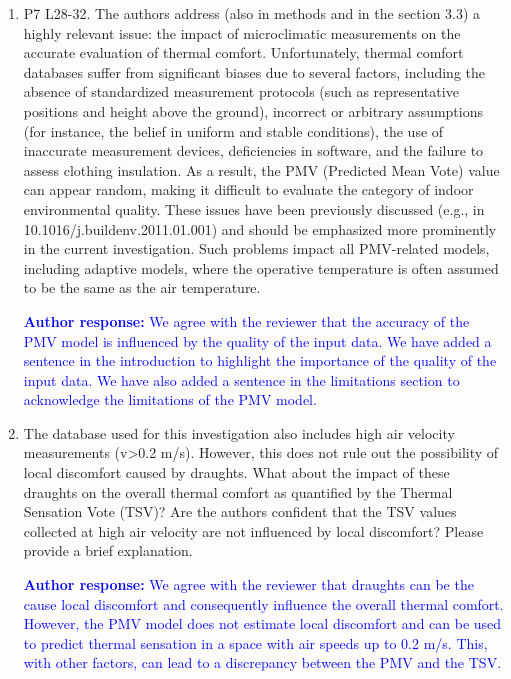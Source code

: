 \documentclass[a4paper, 10pt]{letter}
\newcommand{\response}[1]{\textcolor{blue}{\textbf{Author response:} #1}}
\begin{document}
\begin{letter}
\begin{enumerate}
            \item P7 L28-32.
            The authors address (also in methods and in the section 3.3) a highly relevant issue: the impact of microclimatic measurements on the accurate evaluation of thermal comfort.
            Unfortunately, thermal comfort databases suffer from significant biases due to several factors, including the absence of standardized measurement protocols (such as representative positions and height above the ground), incorrect or arbitrary assumptions (for instance, the belief in uniform and stable conditions), the use of inaccurate measurement devices, deficiencies in software, and the failure to assess clothing insulation.
            As a result, the PMV (Predicted Mean Vote) value can appear random, making it difficult to evaluate the category of indoor environmental quality.
            These issues have been previously discussed (e.g., in 10.1016/j.buildenv.2011.01.001) and should be emphasized more prominently in the current investigation.
            Such problems impact all PMV-related models, including adaptive models, where the operative temperature is often assumed to be the same as the air temperature.

            \response{
                We agree with the reviewer that the accuracy of the PMV model is influenced by the quality of the input data.
                We have added a sentence in the introduction to highlight the importance of the quality of the input data.
                We have also added a sentence in the limitations section to acknowledge the limitations of the PMV model.
            }

            \item The database used for this investigation also includes high air velocity measurements (v>0.2 m/s).
            However, this does not rule out the possibility of local discomfort caused by draughts.
            What about the impact of these draughts on the overall thermal comfort as quantified by the Thermal Sensation Vote (TSV)?
            Are the authors confident that the TSV values collected at high air velocity are not influenced by local discomfort?
            Please provide a brief explanation.

            \response{
                We agree with the reviewer that draughts can be the cause local discomfort and consequently influence the overall thermal comfort.
                However, the PMV model does not estimate local discomfort and can be used to predict thermal sensation in a space with air speeds up to 0.2 m/s.
                This, with other factors, can lead to a discrepancy between the PMV and the TSV.
            }


\end{enumerate}
\end{letter}
\end{document}
